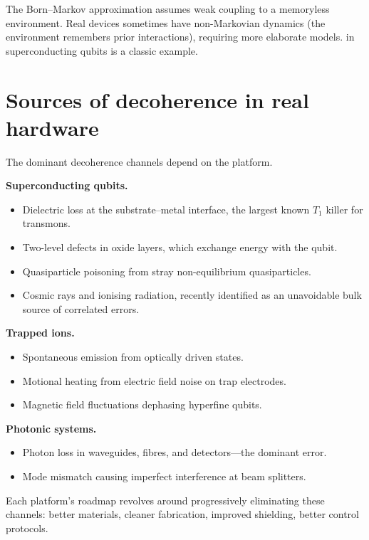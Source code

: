 \begin{remark}
The Born--Markov approximation assumes weak coupling to a memoryless environment. Real devices sometimes have non-Markovian dynamics (the environment remembers prior interactions), requiring more elaborate models.  in superconducting qubits is a classic example.
\end{remark}

\section{Sources of decoherence in real hardware}

The dominant decoherence channels depend on the platform.

\textbf{Superconducting qubits.}
\begin{itemize}
\item Dielectric loss at the substrate--metal interface, the largest known $T_1$ killer for transmons.
\item Two-level defects in oxide layers, which exchange energy with the qubit.
\item Quasiparticle poisoning from stray non-equilibrium quasiparticles.
\item Cosmic rays and ionising radiation, recently identified as an unavoidable bulk source of correlated errors.
\end{itemize}

\textbf{Trapped ions.}
\begin{itemize}
\item Spontaneous emission from optically driven states.
\item Motional heating from electric field noise on trap electrodes.
\item Magnetic field fluctuations dephasing hyperfine qubits.
\end{itemize}

\textbf{Photonic systems.}
\begin{itemize}
\item Photon loss in waveguides, fibres, and detectors---the dominant error.
\item Mode mismatch causing imperfect interference at beam splitters.
\end{itemize}

Each platform's roadmap revolves around progressively eliminating these channels: better materials, cleaner fabrication, improved shielding, better control protocols.

